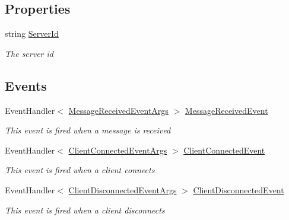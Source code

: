 \subsection*{Properties}
\begin{DoxyCompactItemize}
\item 
string \hyperlink{class_client_server_using_named_pipes_1_1_server_1_1_pipe_server_a3a8a8b1c5a1434d181390d875fab1945}{Server\+Id}
\begin{DoxyCompactList}\small\item\em The server id \end{DoxyCompactList}\end{DoxyCompactItemize}
\subsection*{Events}
\begin{DoxyCompactItemize}
\item 
Event\+Handler$<$ \hyperlink{class_client_server_using_named_pipes_1_1_interfaces_1_1_message_received_event_args}{Message\+Received\+Event\+Args} $>$ \hyperlink{class_client_server_using_named_pipes_1_1_server_1_1_pipe_server_a7fcb193714e540b9a5c6d13b9b918c74}{Message\+Received\+Event}
\begin{DoxyCompactList}\small\item\em This event is fired when a message is received \end{DoxyCompactList}\item 
Event\+Handler$<$ \hyperlink{class_client_server_using_named_pipes_1_1_interfaces_1_1_client_connected_event_args}{Client\+Connected\+Event\+Args} $>$ \hyperlink{class_client_server_using_named_pipes_1_1_server_1_1_pipe_server_a464991f389e0687209b3e2e1e1274cb6}{Client\+Connected\+Event}
\begin{DoxyCompactList}\small\item\em This event is fired when a client connects \end{DoxyCompactList}\item 
Event\+Handler$<$ \hyperlink{class_client_server_using_named_pipes_1_1_interfaces_1_1_client_disconnected_event_args}{Client\+Disconnected\+Event\+Args} $>$ \hyperlink{class_client_server_using_named_pipes_1_1_server_1_1_pipe_server_a6f3d1cbcb8140447abc987d141113e7d}{Client\+Disconnected\+Event}
\begin{DoxyCompactList}\small\item\em This event is fired when a client disconnects \end{DoxyCompactList}\end{DoxyCompactItemize}


